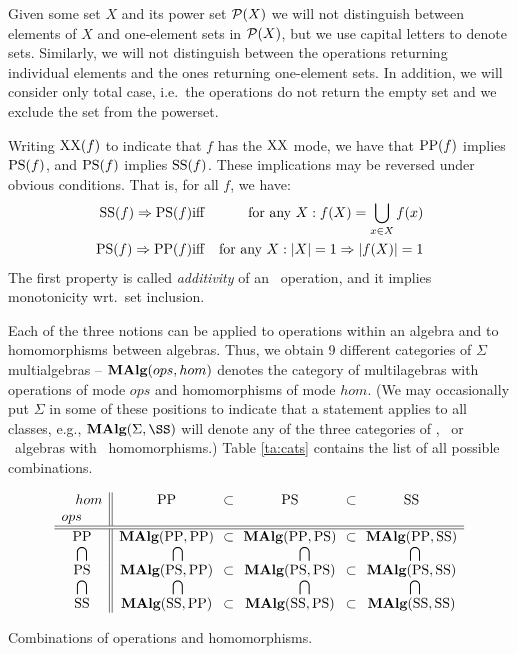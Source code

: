 Given some set $X$ and its power set ${\cal P}(X)$ we will not
distinguish between elements of $X$ and one-element sets in
${\cal P}(X)$, but we use capital letters to denote sets. Similarly, we
will not distinguish between the operations returning individual
elements and the ones returning one-element sets. In addition, we will
consider only total case, i.e.\ the operations do not return the empty
set and we exclude the set from the powerset.

Writing ${\rm XX}(f)$ to indicate that $f$ has the ${\rm XX}$ mode, we have that
${\rm PP}(f)$ implies ${\rm PS}(f)$, and ${\rm PS}(f)$ implies ${\rm SS}(f)$. These
implications may be reversed under obvious conditions. That is, for
all $f$, we have:
\begin{eqnarray}%
\SSs(f) \impl \PS(f) & {\rm iff} 
        & \mbox{for any } X: f(X)=\setsup_{x\in X}f(x) \\
\PS(f) \impl \PP(f)  & {\rm iff} 
        & \mbox{for any } X: |X|=1\impl |f(X)|=1
\end{eqnarray}
The first property is called {\em additivity\/} of an \SSs\ operation,
and it implies monotonicity wrt.\ set inclusion.

Each of the three notions can be applied to operations within an
algebra and to homomorphisms between algebras. Thus, we obtain 9
different categories of $\Sigma$ multialgebras -- $\mbox{\rm\bf MAlg}(ops,hom)$
denotes the category of multilagebras with operations of mode $ops$
and homomorphisms of mode $hom$. (We may occasionally put $\Sigma$ in
some of these positions to indicate that a statement applies to all
classes, e.g., $\MA\Sigma\SS$ will denote any of the three categories
of \SS, \PS\ or \SSs\ algebras with \SSs\ homomorphisms.) Table
\ref{ta:cats} contains the list of all possible combinations.

\begin{table}
\[
\begin{array}{c||c@{\ \ \subset\ \ }c@{\ \ \subset\ \ }c}
\ \ \ hom & \PP & \PS & \SSs \\
\multicolumn{1}{l||}{ops} & \multicolumn{1}{c}{}& \multicolumn{1}{c}{} & \\ \hline\hline
\PP & \MA\PP\PP & \MA\PP\PS & \MA\PP\SSs \\
\bigcap & \multicolumn{1}{c}{\bigcap} & \multicolumn{1}{c}{\bigcap} & \multicolumn{1}{c}{\bigcap} \\
\PS & \MA\PS\PP & \MA\PS\PS & \MA\PS\SSs \\
\bigcap & \multicolumn{1}{c}{\bigcap} & \multicolumn{1}{c}{\bigcap} & \multicolumn{1}{c}{\bigcap} \\
\SSs & \MA\SSs\PP & \MA\SSs\PS & \MA\SSs\SSs 
\end{array}
\]
\caption{Combinations of operations and homomorphisms.}\label{ta:cats}
\end{table}

